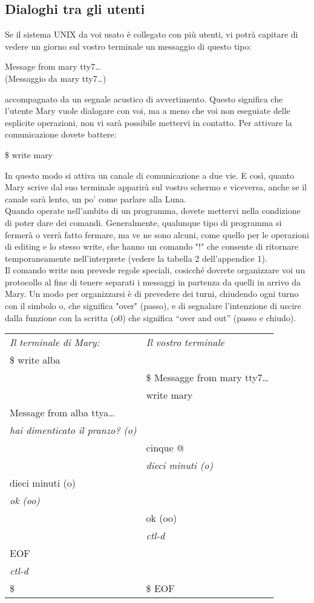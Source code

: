\subsection{Dialoghi tra gli utenti}
Se il sistema UNIX da voi usato è collegato con più utenti, vi potrà capitare di vedere
un giorno sul vostro terminale un messaggio di questo tipo:
\begin{multicols}{2}
	Message from mary tty7\dots\\
	(Messaggio da mary tty7\dots)
\end{multicols}
accompagnato da un segnale acustico di avvertimento. Questo significa che l'utente
Mary vuole dialogare con voi, ma a meno che voi non eseguiate delle esplicite operazioni,
non vi sarà possibile mettervi in contatto. Per attivare la comunicazione dovete
battere:
\begin{multicols}{2}
	\$ write mary\\
\end{multicols}
In questo modo si attiva un canale di comunicazione a due vie. E così, quanto Mary
scrive dal suo terminale apparirà sul vostro schermo e viceversa, anche se il canale sarà
lento, un po' come parlare alla Luna.\\
Quando operate nell'ambito di un programma, dovete mettervi nella condizione di
poter dare dei comandi. Generalmente, qualunque tipo di programma si fermerà o
verrà fatto fermare, ma ve ne sono alcuni, come quello per le operazioni di editing e
lo stesso write, che hanno un comando "!" che consente di ritornare temporaneamente
nell'interprete (vedere la tabella 2 dell'appendice 1).\\
Il comando write non prevede regole speciali, cosicché dovrete organizzare voi un
protocollo al fine di tenere separati i messaggi in partenza da quelli in arrivo da Mary.
Un modo per organizzarsi è di prevedere dei turni, chiudendo ogni turno con il
simbolo o, che significa "over" (passo), e di segnalare l'intenzione di uscire dalla
funzione con la scritta (o0) che significa ``over and out'' (passo e chiudo).\\
\begin{tabular}{ll}
	{\it Il terminale di Mary:} &{\it Il vostro terminale}\\
	\$ write alba\\
	&\$ Messagge from mary tty7\dots\\
	&write mary\\
	Message from alba ttya\dots\\
	{\it hai dimenticato il pranzo? (o)}\\
	& cinque @\\
	& {\it dieci minuti (o)}\\
	dieci minuti (o)\\
	{\it ok (oo)}\\
	&ok (oo)\\
	&{\it ctl-d}\\
	EOF\\
	{\it ctl-d}\\
	\$ & \$ EOF
\end{tabular}\\
